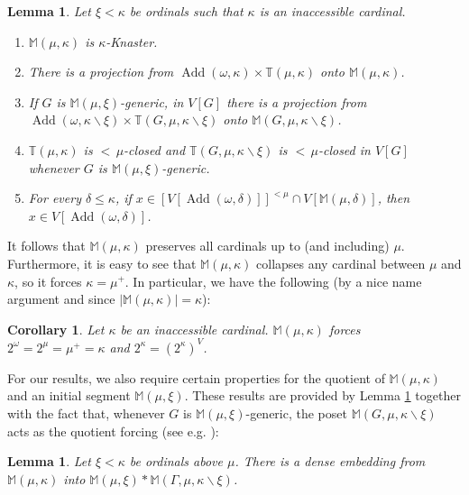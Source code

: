\documentclass[a4paper]{amsart}
\theoremstyle{definition}
\theoremstyle{remark}
\theoremstyle{plain}
\newtheorem{mycol}[mydef]{Corollary}
\newtheorem{mylem}[mydef]{Lemma}
\numberwithin{mydef}{section}
\DeclareMathOperator{\Add}{Add}
\newcommand{\dM}{\mathbb{M}}
\newcommand{\dT}{\mathbb{T}}
\begin{document}
	\begin{mylem}\label{MOmnibus}
		Let $\xi<\kappa$ be ordinals such that $\kappa$ is an inaccessible cardinal.
		\begin{enumerate}
			\item $\dM(\mu,\kappa)$ is $\kappa$-Knaster.
			\item There is a projection from $\Add(\omega,\kappa)\times\dT(\mu,\kappa)$ onto $\dM(\mu,\kappa)$.
			\item If $G$ is $\dM(\mu,\xi)$-generic, in $V[G]$ there is a projection from $\Add(\omega,\kappa\smallsetminus\xi)\times\dT(G,\mu,\kappa\smallsetminus\xi)$ onto $\dM(G,\mu,\kappa\smallsetminus\xi)$.
			\item $\dT(\mu,\kappa)$ is ${<}\,\mu$-closed and $\dT(G,\mu,\kappa\smallsetminus\xi)$ is ${<}\,\mu$-closed in $V[G]$ whenever $G$ is $\dM(\mu,\xi)$-generic.
			\item For every $\delta\leq\kappa$, if $x\in [V[\Add(\omega,\delta)]]^{<\mu}\cap V[\dM(\mu,\delta)]$, then $x\in V[\Add(\omega,\delta)]$.
		\end{enumerate}
	\end{mylem}
	
	It follows that $\dM(\mu,\kappa)$ preserves all cardinals up to (and including) $\mu$. Furthermore, it is easy to see that $\dM(\mu,\kappa)$ collapses any cardinal between $\mu$ and $\kappa$, so it forces $\kappa=\mu^+$. In particular, we have the following (by a nice name argument and since $|\dM(\mu,\kappa)|=\kappa$):
	
	\begin{mycol}\label{CardCol}
		Let $\kappa$ be an inaccessible cardinal. 
		$\dM(\mu,\kappa)$ forces $2^{\omega}=2^{\mu}=\mu^+=\kappa$ and $2^{\kappa}=(2^{\kappa})^V$.
	\end{mycol}
	
	For our results, we also require certain properties for the quotient of $\dM(\mu,\kappa)$ and an initial segment $\dM(\mu,\xi)$. These results are provided by Lemma \ref{MOmnibus} together with the fact that, whenever $G$ is $\dM(\mu,\xi)$-generic, the poset $\dM(G,\mu,\kappa\smallsetminus\xi)$ acts as the quotient forcing (see e.g. \cite[Lemma 2.1.10]{FontanellaPhD}):
	
	\begin{mylem}\label{MDecomp}
		Let $\xi<\kappa$ be ordinals above $\mu$. There is a dense embedding from $\dM(\mu,\kappa)$ into $\dM(\mu,\xi)*\dM(\Gamma,\mu,\kappa\smallsetminus\xi)$.
	\end{mylem}
	
\end{document}
